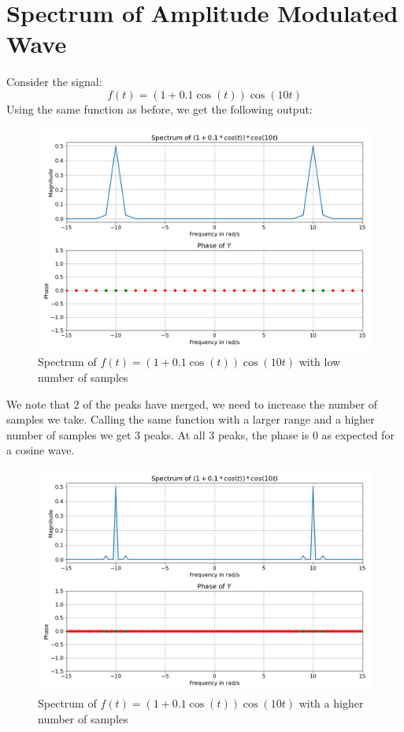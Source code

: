 \documentclass{article}
\begin{document}
\section*{Spectrum of Amplitude Modulated Wave}
Consider the signal:\newline
\begin{equation}
f(t) = (1+0.1\cos(t))\cos(10t)    
\end{equation}
Using the same function as before, we get the following output:
\begin{figure}[!tbh]
\centering
\includegraphics[scale=0.4]{plots/1+cos(0.1t).png}
\caption{Spectrum of $f(t) = (1+0.1\cos(t))\cos(10t)$ with low number of samples}
\label{fig:3}
\end{figure}
\newpage
We note that 2 of the peaks have merged, we need to increase the number of samples we take. Calling the same function with a larger range and a higher number of samples we get 3 peaks. At all 3 peaks, the phase is 0 as expected for a cosine wave.
\begin{figure}[!tbh]
\centering
\includegraphics[scale=0.45]{plots/1+cos(0.1t)_stretched.png}
\caption{Spectrum of $f(t) = (1+0.1\cos(t))\cos(10t)$ with a higher number of samples}
\label{fig:4}
\end{figure}
\end{document}
